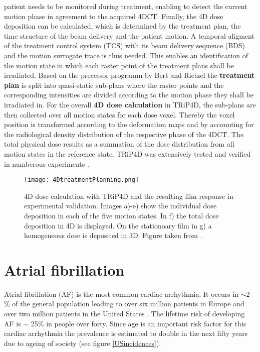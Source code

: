 \documentclass[type=dr, dr=rernat, accentcolor=tud7b,colorbacktitle, bigchapter, openright, twoside, 12pt ]{tudthesis}
\begin{document}
patient needs to be monitored during treatment, enabling to detect the current motion phase in agreement to the acquired 4DCT.
Finally, the 4D dose deposition can be calculated, which is determined by the treatment plan, the time structure of the beam delivery and 
the patient motion. A temporal aligment of the treatment control system (TCS) with its beam delivery sequence (BDS) and the motion 
surrogate trace is thus needed. This enables an identification of the motion state in which each raster point of the treatment plans 
shall be irradiated. Based on the precessor programm by Bert and Rietzel the \textbf{treatment plan} is split into quasi-static sub-plans 
where the raster points and the corresponding intensities are divided according to the motion phase they shall be irradiated in. 
For the overall \textbf{4D dose calculation} in TRiP4D, the sub-plans are then collected over all motion states for each dose voxel. Thereby 
the voxel position is transformed according to the deformation maps and by accounting for the radiological density distribution of 
the respective phase of the 4DCT. The total physical dose results as a summation of the dose distribution from all motion states in 
the reference state. TRiP4D was extensively tested and verified in numberous experiments \cite{Ric12}.  


\begin{figure}[H]
\begin{center}
\texttt{[image: 4DtreatmentPlanning.png]}
\caption{4D dose calculation with TRiP4D and the resulting film response in experimental validation. Images a)-e) show the individual dose 
deposition in each of the five motion states. In f) the total dose deposition in 4D is displayed. On the stationoary film in g) a homogeneous 
dose is deposited in 3D. Figure taken from \cite{Ric12}.}
\end{center}
\end{figure}



\newpage

\section{Atrial fibrillation}

Atrial fibrillation (AF) is the most common cardiac arrhythmia. It occurs in $\sim$2 \% of the general population leading to over six million 
patients in Europe \cite{ESC10} and over two million patients in the United States \cite{CE09}. The lifetime risk of developing AF is 
$\sim$ 25\% in people over forty. Since age is an important risk factor for this cardiac arrhythmia the prevalence is estimated to double in 
the next fifty years due to ageing of society (see figure \ref{USincidences}).\newline
\end{document}
